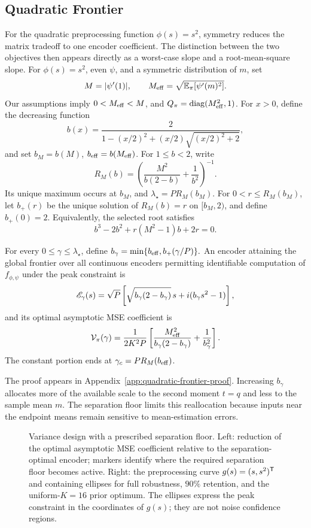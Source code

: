 \subsection{Quadratic Frontier}
For the quadratic preprocessing function $\phi(s)=s^2$, symmetry reduces the matrix tradeoff to one encoder coefficient. The distinction between the two objectives then appears directly as a worst-case slope and a root-mean-square slope. For $\phi(s)=s^2$, even $\psi$, and a symmetric distribution of $m$, set
$$
 M=|\psi'(1)|,\qquad M_{\rm eff}=\sqrt{\mathbb E_\pi[\psi'(m)^2]}.
$$
Our assumptions imply $0<M_{\rm eff}<M$, and $Q_\pi=\operatorname{diag}(M_{\rm eff}^2,1)$. For $x>0$, define the decreasing function
$$
 b(x)=\frac{2}{1-(x/2)^2+(x/2)\sqrt{(x/2)^2+2}},
$$
and set $b_M=b(M)$, $b_{\rm eff}=b(M_{\rm eff})$. For $1\le b<2$, write
$$
 R_M(b)=\left(\frac{M^2}{b(2-b)}+\frac1{b^2}\right)^{-1}.
$$
Its unique maximum occurs at $b_M$, and $\lambda_\star=P R_M(b_M)$. For $0<r\le R_M(b_M)$, let $b_+(r)$ be the unique solution of $R_M(b)=r$ on $[b_M,2)$, and define $b_+(0)=2$. Equivalently, the selected root satisfies
$$b^3-2b^2+r(M^2-1)b+2r=0.$$

\begin{corollary}\label{cor:quadratic-pareto}
For every $0\le\gamma\le\lambda_\star$, define
$b_\gamma=\min\{b_{\rm eff},b_+(\gamma/P)\}.$
An encoder attaining the global frontier over all continuous encoders permitting identifiable computation of $f_{\phi,\psi}$ under the peak constraint is
\begin{equation}
 \mathscr E_\gamma(s)=\sqrt P\left[\sqrt{b_\gamma(2-b_\gamma)}\,s
       +i(b_\gamma s^2-1)\right],
 \label{eq:quadratic-pareto-map}
\end{equation}
and its optimal asymptotic MSE coefficient is
\begin{equation}
 \mathcal V_\pi(\gamma)=\frac1{2K^2P}
 \left[\frac{M_{\rm eff}^2}{b_\gamma(2-b_\gamma)}
       +\frac1{b_\gamma^2}\right].
 \label{eq:quadratic-pareto-value}
\end{equation}
The constant portion ends at $\gamma_c=P R_M(b_{\rm eff})$.
\end{corollary}
The proof appears in Appendix~\ref{app:quadratic-frontier-proof}. Increasing $b_\gamma$ allocates more of the available scale to the second moment $t=q$ and less to the sample mean $m$. The separation floor limits this reallocation because inputs near the endpoint means remain sensitive to mean-estimation errors.

\begin{figure}[t]
 \centering{}
 \caption{Variance design with a prescribed separation floor. Left: reduction of the optimal asymptotic MSE coefficient relative to the separation-optimal encoder; markers identify where the required separation floor becomes active. Right: the preprocessing curve $g(s)=(s,s^2)^\mathsf T$ and containing ellipses for full robustness, $90\%$ retention, and the uniform-$K=16$ prior optimum. The ellipses express the peak constraint in the coordinates of $g(s)$; they are not noise confidence regions.}
 \label{fig:pareto}
\end{figure}

